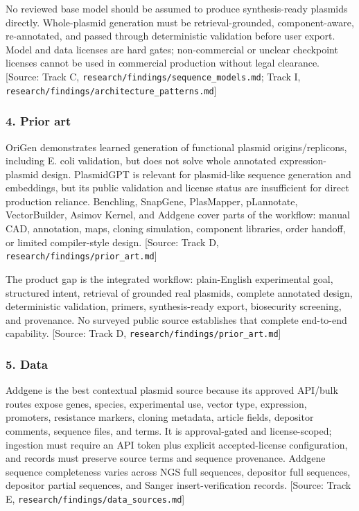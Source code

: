 \documentclass[11pt]{report}
\begin{document}
No reviewed base model should be assumed to produce synthesis-ready plasmids directly. Whole-plasmid generation must be retrieval-grounded, component-aware, re-annotated, and passed through deterministic validation before user export. Model and data licenses are hard gates; non-commercial or unclear checkpoint licenses cannot be used in commercial production without legal clearance. [Source: Track C, \texttt{research/findings/sequence\_models.md}; Track I, \texttt{research/findings/architecture\_patterns.md}]\par

\subsubsection{4. Prior art}

OriGen demonstrates learned generation of functional plasmid origins/replicons, including E. coli validation, but does not solve whole annotated expression-plasmid design. PlasmidGPT is relevant for plasmid-like sequence generation and embeddings, but its public validation and license status are insufficient for direct production reliance. Benchling, SnapGene, PlasMapper, pLannotate, VectorBuilder, Asimov Kernel, and Addgene cover parts of the workflow: manual CAD, annotation, maps, cloning simulation, component libraries, order handoff, or limited compiler-style design. [Source: Track D, \texttt{research/findings/prior\_art.md}]\par

The product gap is the integrated workflow: plain-English experimental goal, structured intent, retrieval of grounded real plasmids, complete annotated design, deterministic validation, primers, synthesis-ready export, biosecurity screening, and provenance. No surveyed public source establishes that complete end-to-end capability. [Source: Track D, \texttt{research/findings/prior\_art.md}]\par

\subsubsection{5. Data}

Addgene is the best contextual plasmid source because its approved API/bulk routes expose genes, species, experimental use, vector type, expression, promoters, resistance markers, cloning metadata, article fields, depositor comments, sequence files, and terms. It is approval-gated and license-scoped; ingestion must require an API token plus explicit accepted-license configuration, and records must preserve source terms and sequence provenance. Addgene sequence completeness varies across NGS full sequences, depositor full sequences, depositor partial sequences, and Sanger insert-verification records. [Source: Track E, \texttt{research/findings/data\_sources.md}]\par
\end{document}
